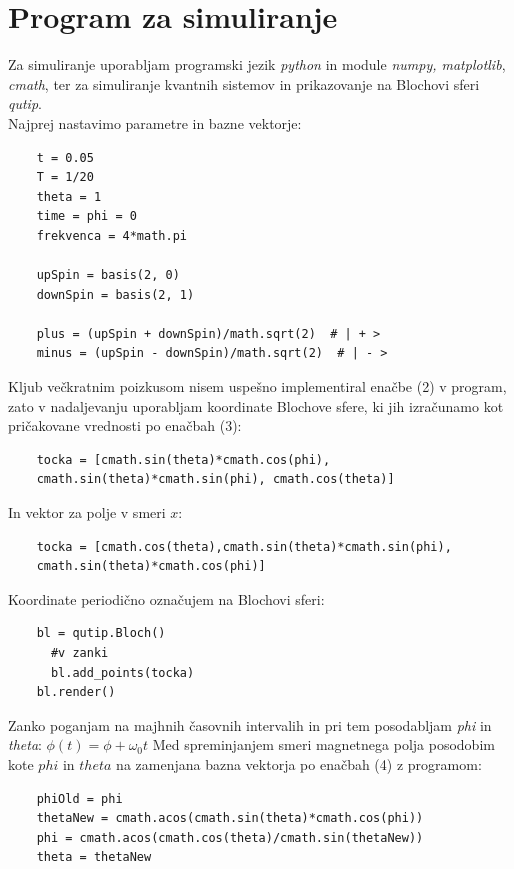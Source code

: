 \documentclass[12pt, a4paper]{article}
\begin{document}
\section{Program za simuliranje}
Za simuliranje uporabljam programski jezik \textit{python} in module \textit{numpy, matplotlib}, \textit{cmath}, ter za simuliranje kvantnih sistemov in prikazovanje na Blochovi sferi \textit{qutip}.\\
Najprej nastavimo parametre in bazne vektorje:
\lstset{language=Python} 
\begin{verbatim}
	t = 0.05
	T = 1/20
	theta = 1
	time = phi = 0
	frekvenca = 4*math.pi 

	upSpin = basis(2, 0)
	downSpin = basis(2, 1)

	plus = (upSpin + downSpin)/math.sqrt(2)  # | + >
	minus = (upSpin - downSpin)/math.sqrt(2)  # | - >
\end{verbatim}
Kljub večkratnim poizkusom nisem uspešno implementiral enačbe (2) v program, zato v nadaljevanju uporabljam koordinate Blochove sfere, ki jih izračunamo kot pričakovane vrednosti po enačbah (3):
\begin{verbatim}
	tocka = [cmath.sin(theta)*cmath.cos(phi), 
	cmath.sin(theta)*cmath.sin(phi), cmath.cos(theta)]
\end{verbatim}
In vektor za polje v smeri $x$:
\begin{verbatim}
	tocka = [cmath.cos(theta),cmath.sin(theta)*cmath.sin(phi),
	cmath.sin(theta)*cmath.cos(phi)]
\end{verbatim}
Koordinate periodično označujem na Blochovi sferi:
\begin{verbatim}
	bl = qutip.Bloch()
	  #v zanki	
	  bl.add_points(tocka)
	bl.render() 
\end{verbatim}
Zanko poganjam na majhnih časovnih intervalih in pri tem posodabljam \textit{phi} in \textit{theta}: $\phi(t) = \phi + \omega_0t$
Med spreminjanjem smeri magnetnega polja posodobim kote $phi$ in $theta$ na zamenjana bazna vektorja po enačbah (4) z programom:
\begin{verbatim}
	phiOld = phi
	thetaNew = cmath.acos(cmath.sin(theta)*cmath.cos(phi))
	phi = cmath.acos(cmath.cos(theta)/cmath.sin(thetaNew))
	theta = thetaNew
\end{verbatim}
\end{document}
